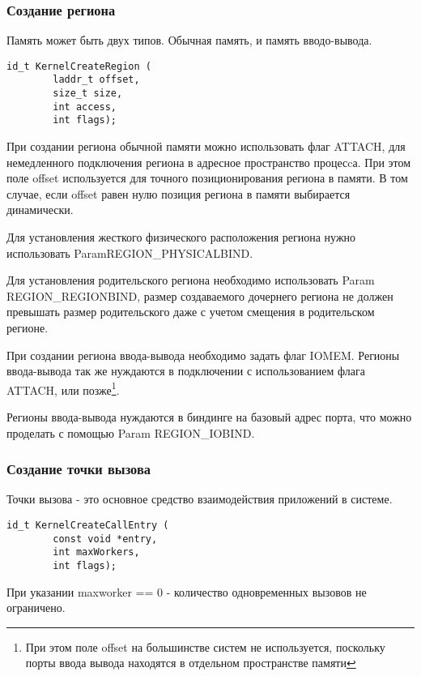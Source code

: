\subsubsection{Создание региона}

Память может быть двух типов. Обычная память, и память вводо-вывода.

\begin{verbatim}
id_t KernelCreateRegion (
        laddr_t offset,
        size_t size,
        int access,
        int flags);
\end{verbatim}\par

При создании региона обычной памяти можно использовать флаг ATTACH, для
немедленного подключения региона в адресное пространство процесcа. При этом поле
offset используется для точного позиционирования региона в памяти. В том случае,
если offset равен нулю позиция региона в памяти выбирается динамически.

Для установления жесткого физического расположения региона нужно использовать
Param\break REGION\_PHYSICALBIND.

Для установления родительского региона необходимо использовать Param
REGION\_REGIONBIND, размер создаваемого дочернего региона не должен превышать
размер родительского даже с учетом смещения в родительском регионе.

При создании региона ввода-вывода необходимо задать флаг IOMEM. Регионы
ввода-вывода так же нуждаются в подключении с использованием флага ATTACH,
или позже\footnote{При этом поле offset на большинстве систем не используется,
поскольку порты ввода вывода находятся в отдельном пространстве памяти}.

Регионы ввода-вывода нуждаются в биндинге на базовый адрес порта, что можно
проделать с помощью Param REGION\_IOBIND.

\subsubsection{Создание точки вызова}

Точки вызова - это основное средство взаимодействия приложений в системе.

\begin{verbatim}
id_t KernelCreateCallEntry (
        const void *entry,
        int maxWorkers,
        int flags);
\end{verbatim}\par

При указании maxworker == 0 - количество одновременных вызовов не ограничено.


